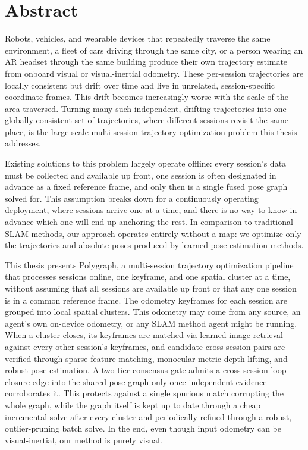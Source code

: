 %

\vspace{3cm}

\chapter*{Abstract}
\noindent
Robots, vehicles, and wearable devices that repeatedly traverse the same environment, a fleet of cars driving through the same city, or a person wearing an AR headset through the same building produce their own trajectory estimate from onboard visual or visual-inertial odometry. These per-session trajectories are locally consistent but drift over time and live in unrelated, session-specific coordinate frames. This drift becomes increasingly worse with the scale of the area traversed. Turning many such independent, drifting trajectories into one globally consistent set of trajectories, where different sessions revisit the same place, is the large-scale multi-session trajectory optimization problem this thesis addresses.

\noindent
Existing solutions to this problem largely operate offline: every session's data must be collected and available up front, one session is often designated in advance as a fixed reference frame, and only then is a single fused pose graph solved for. This assumption breaks down for a continuously operating deployment, where sessions arrive one at a time, and there is no way to know in advance which one will end up anchoring the rest. In comparison to traditional SLAM methods, our approach operates entirely without a map: we optimize only the trajectories and absolute poses produced by learned pose estimation methods.

\noindent
This thesis presents Polygraph, a multi-session trajectory optimization pipeline that processes sessions online, one keyframe, and one spatial cluster at a time, without assuming that all sessions are available up front or that any one session is in a common reference frame. The odometry keyframes for each session are grouped into local spatial clusters. This odometry may come from any source, an agent's own on-device odometry, or any SLAM method agent might be running. When a cluster closes, its keyframes are matched via learned image retrieval against every other session's keyframes, and candidate cross-session pairs are verified through sparse feature matching, monocular metric depth lifting, and robust pose estimation. A two-tier consensus gate admits a cross-session loop-closure edge into the shared pose graph only once independent evidence corroborates it. This protects against a single spurious match corrupting the whole graph, while the graph itself is kept up to date through a cheap incremental solve after every cluster and periodically refined through a robust, outlier-pruning batch solve. In the end, even though input odometry can be visual-inertial, our method is purely visual.

